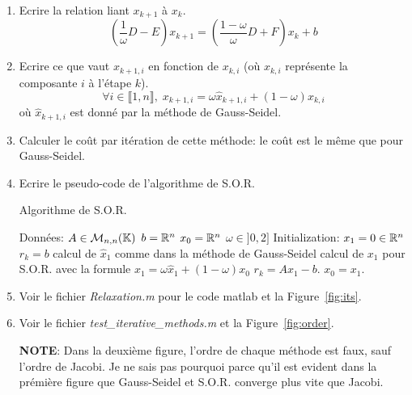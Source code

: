 \documentclass[a4paper,10pt]{article}
\begin{document}
\begin{enumerate}
    \item Ecrire la relation liant $x_{k+1}$ à $x_k$.
\[
(\frac{1}{\omega}D - E)x_{k + 1} = (\frac{1 - \omega}{\omega}D + F) x_k + b
\]

    \item Ecrire ce que vaut $x_{k+1,i}$ en fonction de $x_{k,i}$ (où $x_{k,i}$ représente la
composante $i$ à l'étape $k$).
\[
\forall i \in \llbracket 1, n \rrbracket, \;
x_{k + 1, i} = \omega \hat{x}_{k+1, i} + (1 - \omega) x_{k, i}
\]
où $\hat{x}_{k+1, i}$ est donné par la méthode de Gauss-Seidel.

    \item Calculer le coût par itération de cette méthode: le coût est le même que
    pour Gauss-Seidel.

    \item Ecrire le pseudo-code de l'algorithme de S.O.R.

\begin{algorithm}
\caption{Algorithme de S.O.R.}
\begin{algorithmic}
\STATE Données:
\STATE $A \in \mathcal{M}_{n, n}(\mathbb{K})$
\STATE $b = \mathbb{R}^n$
\STATE $x_0 = \mathbb{R}^n$
\STATE $\omega \in ]0, 2]$
\STATE Initialization:
\STATE $x_1 = 0 \in \mathbb{R}^n$
\STATE $r_k = b$
    \STATE calcul de $\hat{x}_1$ comme dans la méthode de Gauss-Seidel
    \STATE calcul de $x_1$ pour S.O.R. avec la formule
    $ x_1 = \omega \hat{x}_1 + (1 - \omega) x_0$
    \STATE $r_k = Ax_1 - b$.
    \STATE $x_0 = x_1$.
\ENDWHILE
\end{algorithmic}
\end{algorithm}

    \item Voir le fichier \emph{Relaxation.m} pour le code matlab et la Figure~\ref{fig:its}.

    \item Voir le fichier \emph{test\_iterative\_methods.m} et la Figure~\ref{fig:order}.

    \textbf{NOTE}: Dans la deuxième figure, l'ordre de chaque méthode est faux, sauf l'ordre
    de Jacobi. Je ne sais pas pourquoi parce qu'il est evident dans la prémière figure
    que Gauss-Seidel et S.O.R. converge plus vite que Jacobi.

\end{enumerate}
\end{document}
